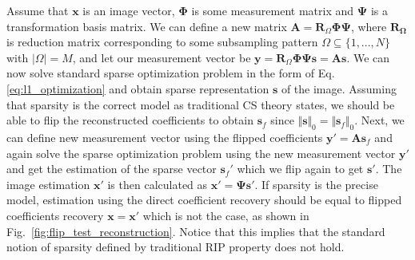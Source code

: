 \documentclass[journal]{IEEEtran}
\begin{document}
Assume that $\boldsymbol{x}$ is an image vector, $\boldsymbol{\Phi}$ is some measurement matrix and $\boldsymbol{\Psi}$ is a transformation basis matrix. We can define a new matrix $\boldsymbol{A}=\boldsymbol{R}_\Omega \boldsymbol{\Phi}\boldsymbol{\Psi}$, where $\boldsymbol{R_\Omega}$ is reduction matrix corresponding to some subsampling pattern $\Omega \subseteq \{1,...,N\}$ with $\vert \Omega\vert = M$, and let our measurement vector be $\boldsymbol{y}=\boldsymbol{R}_\Omega\boldsymbol{\Phi}\boldsymbol{\Psi}\boldsymbol{s}=\boldsymbol{A}\boldsymbol{s}$. We can now solve standard sparse optimization problem in the form of Eq. \ref{eq:l1_optimization} and obtain sparse representation $\boldsymbol{s}$ of the image. Assuming that sparsity is the correct model as traditional CS theory states, we should be able to flip the reconstructed coefficients to obtain $\boldsymbol{s}_f$ since $\Vert\boldsymbol{s}\Vert_0=\Vert\boldsymbol{s}_f\Vert_0$. Next, we can define new measurement vector using the flipped coefficients $\boldsymbol{{y'}}=\boldsymbol{A}\boldsymbol{s}_f$ and again solve the sparse optimization problem using the new measurement vector $\boldsymbol{{y'}}$ and get the estimation of the sparse vector $\boldsymbol{s}_{f}'$ which we flip again to get $\boldsymbol{{s'}}$. The image estimation $\boldsymbol{{x'}}$ is then calculated as $\boldsymbol{{x}'}=\boldsymbol{\Psi}\boldsymbol{{s'}}$. If sparsity is the precise model, estimation using the direct coefficient recovery should be equal to flipped coefficients recovery $\boldsymbol{{x}=\boldsymbol{x'}}$ which is not the case, as shown in Fig.~\ref{fig:flip_test_reconstruction}. Notice that this implies that the standard notion of sparsity defined by traditional RIP property does not hold.
\end{document}
